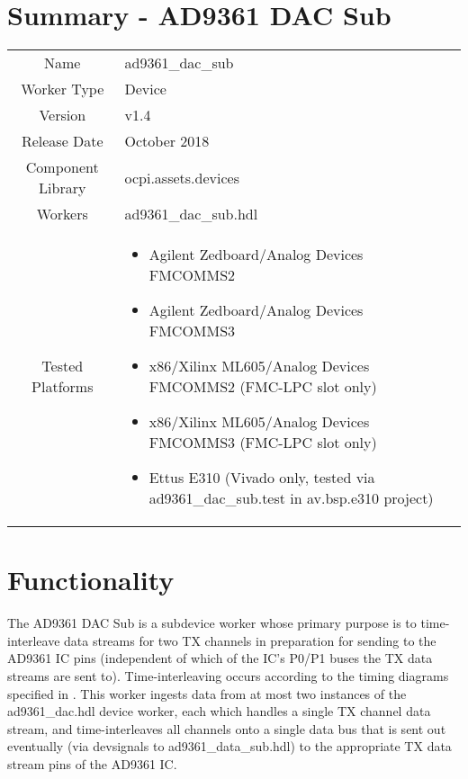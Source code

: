 \documentclass{article}
\author{} %
\date{Version \docVersion} %
\title{\docTitle}
\def\docVersion{1.4}
\def\comp{ad9361\_dac\_sub}
\def\Comp{AD9361 DAC Sub}
\begin{document}
\section*{Summary - \Comp}
\begin{tabular}{|c|M{13.5cm}|}
	\hline
	                  &                  \\
	\hline
	Name              & \comp            \\
	\hline
	Worker Type       & Device           \\
	\hline
	Version           & v\docVersion     \\
	\hline
	Release Date      & October 2018         \\
	\hline
	Component Library & ocpi.assets.devices     \\
	\hline
	Workers           & \comp.hdl        \\
	\hline
	Tested Platforms  &
\begin{itemize}
  \item Agilent Zedboard/Analog Devices FMCOMMS2
  \item Agilent Zedboard/Analog Devices FMCOMMS3
  \item x86/Xilinx ML605/Analog Devices FMCOMMS2 (FMC-LPC slot only)
  \item x86/Xilinx ML605/Analog Devices FMCOMMS3 (FMC-LPC slot only)
  \item Ettus E310 (Vivado only, tested via \comp{}.test in av.bsp.e310 project)
\end{itemize} \\
	\hline
\end{tabular}

\section*{Functionality}
	The \Comp{} is a subdevice worker whose primary purpose is to time-interleave data streams for two TX channels in preparation for sending to the AD9361 IC pins (independent of which of the IC's P0/P1 buses the TX data streams are sent to). Time-interleaving occurs according to the timing diagrams specified in \cite{adi_ug570}. This worker ingests data from at most two instances of the ad9361\_dac.hdl device worker, each which handles a single TX channel data stream, and time-interleaves all channels onto a single data bus that is sent out eventually (via devsignals to ad9361\_data\_sub.hdl\cite{data_sub_comp_datasheet}) to the appropriate TX data stream pins of the AD9361 IC\cite{ad9361}.
\end{document}
